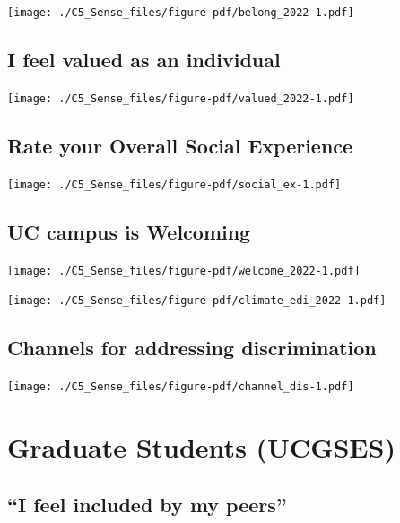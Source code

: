 \documentclass[
  letterpaper,
  DIV=11,
  numbers=noendperiod]{scrreprt}
\begin{document}
\texttt{[image: ./C5\_Sense\_files/figure-pdf/belong\_2022-1.pdf]}

\hypertarget{i-feel-valued-as-an-individual}{%
\subsection{I feel valued as an
individual}\label{i-feel-valued-as-an-individual}}

\texttt{[image: ./C5\_Sense\_files/figure-pdf/valued\_2022-1.pdf]}

\hypertarget{rate-your-overall-social-experience}{%
\subsection{Rate your Overall Social
Experience}\label{rate-your-overall-social-experience}}

\texttt{[image: ./C5\_Sense\_files/figure-pdf/social\_ex-1.pdf]}

\hypertarget{uc-campus-is-welcoming}{%
\subsection{UC campus is Welcoming}\label{uc-campus-is-welcoming}}

\texttt{[image: ./C5\_Sense\_files/figure-pdf/welcome\_2022-1.pdf]}

\texttt{[image: ./C5\_Sense\_files/figure-pdf/climate\_edi\_2022-1.pdf]}

\hypertarget{channels-for-addressing-discrimination}{%
\subsection{Channels for addressing
discrimination}\label{channels-for-addressing-discrimination}}

\texttt{[image: ./C5\_Sense\_files/figure-pdf/channel\_dis-1.pdf]}

\hypertarget{graduate-students-ucgses-1}{%
\section{Graduate Students (UCGSES)}\label{graduate-students-ucgses-1}}

\hypertarget{i-feel-included-by-my-peers}{%
\subsection{``I feel included by my
peers''}\label{i-feel-included-by-my-peers}}
\end{document}
